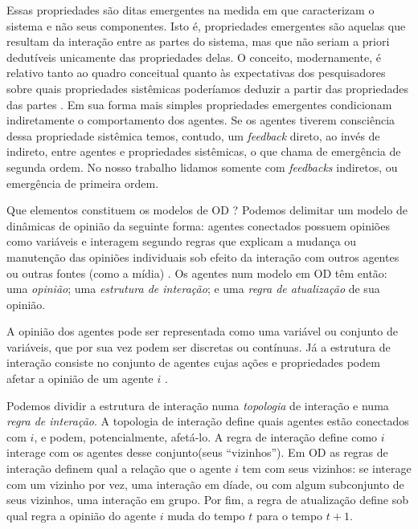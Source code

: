   Essas propriedades são ditas emergentes na medida em que caracterizam o
  sistema e não seus componentes. Isto é, propriedades emergentes são aquelas
  que resultam da interação entre as partes do sistema, mas que não seriam a
  priori dedutíveis unicamente das propriedades delas. O conceito, modernamente,
  é relativo tanto ao quadro conceitual quanto às expectativas dos pesquisadores
  sobre quais propriedades sistêmicas poderíamos deduzir a partir das
  propriedades das partes \cite{epstein2006generative}. Em sua forma mais
  simples propriedades emergentes condicionam indiretamente o comportamento dos
  agentes. Se os agentes tiverem consciência dessa propriedade sistêmica temos,
  contudo, um \textit{feedback} direto, ao invés de indireto, entre agentes e
  propriedades sistêmicas, o que  chama de
  emergência de segunda ordem. No nosso trabalho lidamos somente com
  \textit{feedbacks} indiretos, ou emergência de primeira ordem.

  Que elementos constituem os modelos de OD ? Podemos delimitar um modelo de
  dinâmicas de opinião da seguinte forma: agentes conectados possuem opiniões
  como variáveis e interagem segundo regras que explicam a mudança ou manutenção
  das opiniões individuais sob efeito da interação com outros agentes ou outras
  fontes (como a mídia) \cite{sirbu2017opinion}. Os agentes num modelo em OD têm
  então: uma \textit{opinião}; uma \textit{estrutura de interação}; e uma
  \textit{regra de atualização} de sua opinião.


  A opinião dos agentes pode ser representada como uma variável ou conjunto de
  variáveis, que por sua vez podem ser discretas ou contínuas. Já a estrutura de
  interação consiste no conjunto de agentes cujas ações e propriedades podem
  afetar a opinião de um agente \(i\) \cite{page2008uncertainty}.

  Podemos dividir a estrutura de interação numa \textit{topologia} de interação e
  numa \textit{regra de interação}. A topologia de interação define quais
  agentes estão conectados com \(i\), e podem, potencialmente, afetá-lo. A regra
  de interação define como \(i\) interage com os agentes desse conjunto(seus
  ``vizinhos''). Em OD as regras de interação definem qual a
  relação que o agente \(i\) tem com seus vizinhos: se interage com um vizinho
  por vez, uma interação em díade, ou com algum subconjunto de seus vizinhos,
  uma interação em grupo. Por fim, a regra de atualização define sob qual regra
  a opinião do agente \(i\) muda do tempo \(t\) para o tempo \(t+1\). 

